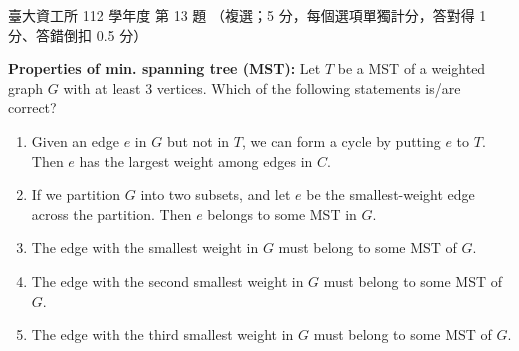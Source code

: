\begin{pastexam}[label={px:ntu-112-dsa-13}]{臺大資工所 112 學年度 第 13 題}
（複選；5 分，每個選項單獨計分，答對得 1 分、答錯倒扣 0.5 分）

\textbf{Properties of min. spanning tree (MST):} Let $T$ be a MST of a weighted graph $G$ with at
least 3 vertices. Which of the following statements is/are correct?
\begin{enumerate}[label=(\Alph*)]
\item Given an edge $e$ in $G$ but not in $T$, we can form a cycle by putting $e$ to $T$. Then $e$
has the largest weight among edges in $C$.
\item If we partition $G$ into two subsets, and let $e$ be the smallest-weight edge across the
partition. Then $e$ belongs to some MST in $G$.
\item The edge with the smallest weight in $G$ must belong to some MST of $G$.
\item The edge with the second smallest weight in $G$ must belong to some MST of $G$.
\item The edge with the third smallest weight in $G$ must belong to some MST of $G$.
\end{enumerate}
\end{pastexam}

